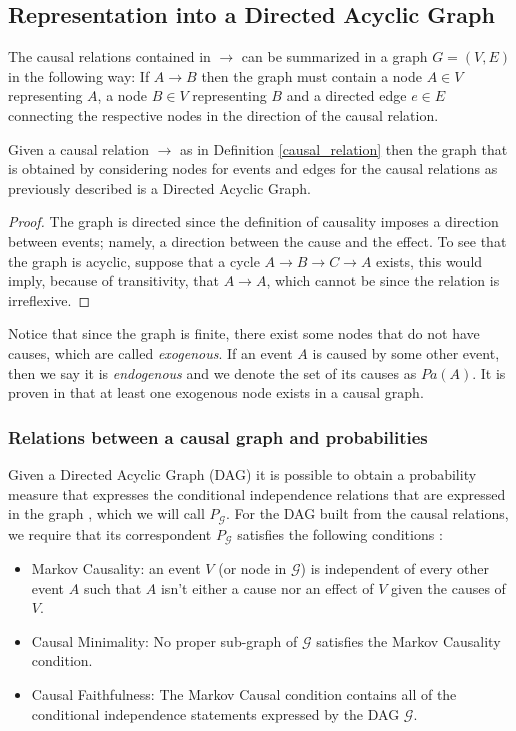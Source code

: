 \documentclass{svjour3}                     %
\begin{document}
\subsection{Representation into a Directed Acyclic Graph}
The causal relations contained in $\to$ can be summarized in a graph $G=(V,E)$ in the following way: If $A \to B$ then the graph must contain a node $A \in V$ representing $A$, a node  $B \in V$ representing $B$ and a directed edge $e \in E$ connecting the respective nodes in the direction of the causal relation.

\begin{proposition}
Given a causal relation $\to$ as in Definition \ref{causal_relation} then the graph that is obtained by considering nodes for events and edges for the causal relations as previously described is a Directed Acyclic Graph.
\end{proposition}

\begin{proof}
The graph is directed since the definition of causality imposes a direction between events; namely, a direction between the cause and the effect. To see that the graph is acyclic, suppose that a cycle $A \to B \to C \to A$ exists, this would imply, because of transitivity, that $A \to A$, which cannot be since the relation is irreflexive.
\end{proof}

Notice that since the graph is finite, there exist some nodes that do not have causes, which are called \textit{exogenous}. If an event $A$ is caused by some other event, then we say it is \textit{endogenous} and we denote the set of its causes as $Pa(A)$. It is proven in \cite{kiiveri1984recursive} that at least one exogenous node exists in a causal graph.

\subsubsection{Relations between a causal graph and probabilities}
Given a Directed Acyclic Graph (DAG) it is possible to obtain a probability measure that expresses the conditional independence relations that are expressed in the graph \citep{koller2009probabilistic}, which we will call $P_\mathcal{G}$. For the DAG built from the causal relations, we require that its correspondent $P_\mathcal{G}$ satisfies the following conditions \citep{spirtes2000causation}:
\begin{itemize}
\item Markov Causality: an event $V$ (or node in $\mathcal{G}$) is independent of every other event $A$ such that $A$ isn't either a cause nor an effect of $V$ given the causes of $V$.
\item Causal Minimality: No proper sub-graph of $\mathcal{G}$ satisfies the Markov Causality condition.
\item Causal Faithfulness: The Markov Causal condition contains all of the conditional independence statements expressed by the DAG $\mathcal{G}$.
\end{itemize}
\end{document}
